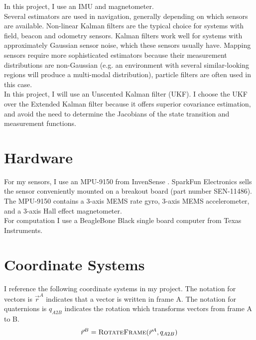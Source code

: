 \documentclass[conference]{IEEEtran}
\begin{document}
In this project, I use an IMU and magnetometer.\\

Several estimators are used in navigation, generally depending on which sensors are available. Non-linear Kalman filters are the typical choice for systems with field, beacon and odometry sensors. Kalman filters work well for systems with approximately Gaussian sensor noise, which these sensors usually have. Mapping sensors require more sophisticated estimators because their measurement distributions are non-Gaussian (e.g. an environment with several similar-looking regions will produce a multi-modal distribution), particle filters are often used in this case.\\

 In this project, I will use an Unscented Kalman filter (UKF). I choose the UKF over the Extended Kalman filter because it offers superior covariance estimation, and avoid the need to determine the Jacobians of the state transition and measurement functions.\\ 

\section{Hardware}
For my sensors, I use an MPU-9150 from InvenSense \cite{mpu9150}. SparkFun Electronics sells the sensor conveniently mounted on a breakout board (part number SEN-11486). The MPU-9150 contains a 3-axis MEMS rate gyro, 3-axis MEMS accelerometer, and a 3-axis Hall effect magnetometer.\\
For computation I use a BeagleBone Black single board computer from Texas Instruments.\\

\section{Coordinate Systems}
I reference the following coordinate systems in my project. The notation for vectors is $\vec{r}^{A}$ indicates that a vector is written in frame A. The notation for quaternions is $q_{A2B}$ indicates the rotation which transforms vectors from frame A to B.
\begin{equation}
  \vec{r}^{B} = \textproc{RotateFrame}(\vec{r}^{A}, q_{A2B})
\end{equation}
\end{document}
